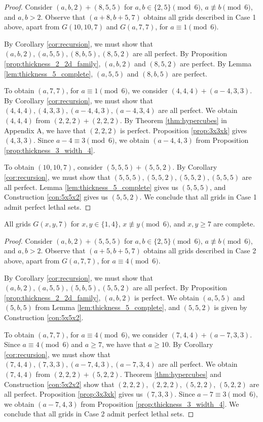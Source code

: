 \begin{proof}
Consider $(a,b,2) + (8,5,5)$ for $a,b \in \{2,5\} \pmod 6$, $a \not\equiv b \pmod 6$, and $a,b > 2$. Observe that $(a+8,b+5,7)$ obtains all grids described in Case 1 above, apart from $G(10,10,7)$ and $G(a, 7,7)$, for $a \equiv 1 \pmod 6$. 

By Corollary \ref{cor:recursion}, we must show that $(a,b,2), (a,5,5), (8,b,5), (8,5,2)$ are all perfect. By Proposition \ref{prop:thickness_2_2d_family}, $(a,b,2)$ and $(8,5,2)$ are perfect. By Lemma \ref{lem:thickness_5_complete}, $(a,5,5)$ and $(8,b,5)$ are perfect. 

To obtain $(a,7,7)$, for $a \equiv 1 \pmod 6$, we consider $(4,4,4) + (a-4,3,3)$. By Corollary \ref{cor:recursion}, we must show that $(4,4,4), (4,3,3), (a-4,4,3), (a-4,3,4)$ are all perfect. We obtain $(4,4,4)$ from $(2,2,2)+(2,2,2)$. By Theorem \ref{thm:hypercubes} in Appendix A, we have that $(2,2,2)$ is perfect. Proposition \ref{prop:3x3xk} gives $(4,3,3)$. Since $a-4 \equiv 3 \pmod 6$, we obtain $(a-4,4,3)$ from Proposition \ref{prop:thickness_3_width_4}.

To obtain $(10,10,7)$, consider $(5,5,5) + (5,5,2)$. By Corollary \ref{cor:recursion}, we must show that $(5,5,5), (5,5,2), (5,5,2), (5,5,5)$ are all perfect. Lemma \ref{lem:thickness_5_complete} gives us $(5,5,5)$, and Construction \ref{con:5x5x2} gives us $(5,5,2)$. We conclude that all grids in Case 1 admit perfect lethal sets. 
\end{proof}

\begin{lem}
\label{lem:thickness_7_case_2}
All grids $G(x,y,7)$ for $x,y \in \{1,4\}$, $x \not\equiv y \pmod 6$, and $x,y \geq 7$ are complete.
\end{lem}

\begin{proof}
Consider $(a,b,2) + (5,5,5)$ for $a,b \in \{2,5\} \pmod 6$, $a \not\equiv b \pmod 6$, and $a,b > 2$. Observe that $(a+5,b+5,7)$ obtains all grids described in Case 2 above, apart from $G(a,7,7)$, for $a \equiv 4 \pmod 6$. 

By Corollary \ref{cor:recursion}, we must show that $(a,b,2), (a,5,5), (5,b,5), (5,5,2)$ are all perfect. By Proposition \ref{prop:thickness_2_2d_family}, $(a,b,2)$ is perfect. We obtain $(a,5,5)$ and $(5,b,5)$ from Lemma \ref{lem:thickness_5_complete}, and $(5,5,2)$ is given by Construction \ref{con:5x5x2}.

To obtain $(a,7,7)$, for $a \equiv 4 \pmod 6$, we consider $(7,4,4) + (a-7,3,3)$. Since $a \equiv 4 \pmod 6$ and $a \geq 7$, we have that $a \geq 10$. By Corollary \ref{cor:recursion}, we must show that $(7,4,4), (7,3,3), (a-7,4,3), (a-7,3,4)$ are all perfect. We obtain $(7,4,4)$ from $(2,2,2) + (5,2,2)$. Theorem \ref{thm:hypercubes} and Construction \ref{con:5x2x2} show that $(2,2,2)$, $(2,2,2)$, $(5,2,2)$, $(5,2,2)$ are all perfect. Proposition \ref{prop:3x3xk} gives us $(7,3,3)$. Since $a-7 \equiv 3 \pmod 6$, we obtain $(a-7,4,3)$ from Proposition \ref{prop:thickness_3_width_4}. We conclude that all grids in Case 2 admit perfect lethal sets. 
\end{proof}

